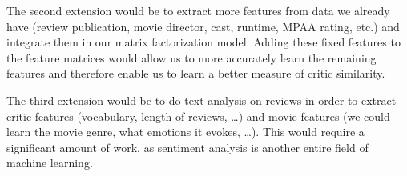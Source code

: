 \documentclass[12pt]{article}
\begin{document}
The second extension would be to extract more features from data we already have (review publication, movie director, cast, runtime, MPAA rating, etc.) and integrate them in our matrix factorization model. Adding these fixed features to the feature matrices would allow us to more accurately learn the remaining features and therefore enable us to learn a better measure of critic similarity.

The third extension would be to do text analysis on reviews in order to extract critic features (vocabulary, length of reviews, \dots) and movie features (we could learn the movie genre, what emotions it evokes, \dots). This would require a significant amount of work, as sentiment analysis is another entire field of machine learning.

{}

\end{document}
